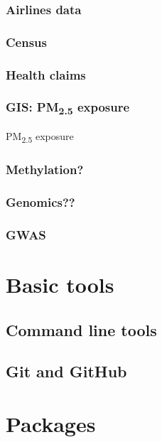 \documentclass[]{book}
\theoremstyle{definition}
\theoremstyle{definition}
\theoremstyle{definition}
\theoremstyle{remark}
\begin{document}
\subsection{Airlines data}\label{airlines-data}

\subsection{Census}\label{census}

\subsection{Health claims}\label{health-claims}

\subsection{\texorpdfstring{GIS: PM\textsubscript{2.5}
exposure}{GIS: PM2.5 exposure}}\label{gis-pm2.5-exposure}

PM\textsubscript{2.5} exposure

\subsection{Methylation?}\label{methylation}

\subsection{Genomics??}\label{genomics}

\subsection{GWAS}\label{gwas}

\chapter{Basic tools}\label{basics}

\section{Command line tools}\label{command-line-tools}

\section{Git and GitHub}\label{git-and-github}

\chapter{Packages}\label{packages}
\end{document}
